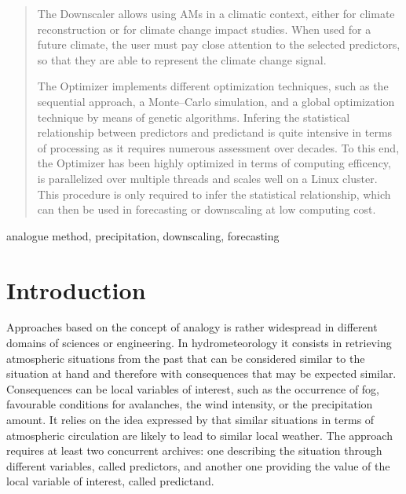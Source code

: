 \documentclass[review]{elsarticle}
\begin{document}
\begin{frontmatter}
\begin{abstract}
The Downscaler allows using AMs in a climatic context, either for climate reconstruction or for climate change impact studies. When used for a future climate, the user must pay close attention to the selected predictors, so that they are able to represent the climate change signal.

The Optimizer implements different optimization techniques, such as the sequential approach, a Monte--Carlo simulation, and a global optimization technique by means of genetic algorithms. Infering the statistical relationship between predictors and predictand is quite intensive in terms of processing as it requires numerous assessment over decades. To this end, the Optimizer has been highly optimized in terms of computing efficency, is parallelized over multiple threads and scales well on a Linux cluster. This procedure is only required to infer the statistical relationship, which can then be used in forecasting or downscaling at low computing cost.
  

\end{abstract}

\begin{keyword}
analogue method, precipitation, downscaling, forecasting
\end{keyword}

\end{frontmatter}

\linenumbers


\section{Introduction}

Approaches based on the concept of analogy is rather widespread in different domains of sciences or engineering. In hydrometeorology it consists in retrieving atmospheric situations from the past that can be considered similar to the situation at hand and therefore with consequences that may be expected similar. Consequences can be local variables of interest, such as the occurrence of fog, favourable conditions for avalanches, the wind intensity, or the precipitation amount. It relies on the idea expressed by \citet{Lorenz1956, Lorenz1969} that similar situations in terms of atmospheric circulation are likely to lead to similar local weather. The approach requires at least two concurrent archives: one describing the situation through different variables, called predictors, and another one providing the value of the local variable of interest, called predictand.
\end{document}
